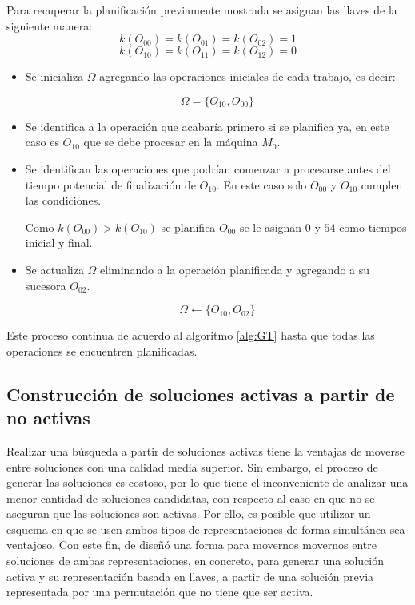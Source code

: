 Para recuperar la planificación previamente mostrada se asignan las llaves de la siguiente manera: \[k(O_{00})=k(O_{01})=k(O_{02})=1\]  \[k(O_{10})=k(O_{11})=k(O_{12})=0\]
\begin{itemize}
    \item Se inicializa $\Omega$ agregando las operaciones iniciales de cada trabajo, es decir:

\[\Omega = \{O_{10},O_{00}\}\]

     \item Se identifica a la operación que acabaría primero si se planifica ya, en este caso es $O_{10}$ que se debe procesar en la máquina $M_0$. 

     \item Se identifican las operaciones que podrían comenzar a procesarse antes del tiempo potencial de finalización de $O_{10}$. 
		 En este caso solo $O_{00}$ y  $O_{10}$ cumplen las condiciones.

Como $k(O_{00})>k(O_{10})$ se planifica $O_{00}$ se le asignan $0$ y $54$ como tiempos inicial y final.

     \item Se actualiza $\Omega$ eliminando a la operación planificada y agregando a su sucesora $O_{02}$.

\[\Omega\leftarrow \{O_{10},O_{02}\}\]
\end{itemize}
Este proceso continua de acuerdo al algoritmo \ref{alg:GT} hasta que todas las operaciones se encuentren planificadas.

\subsection{Construcción de soluciones activas a partir de no activas}

Realizar una búsqueda a partir de soluciones activas tiene la ventajas de moverse entre soluciones con una calidad media
superior.
%
Sin embargo, el proceso de generar las soluciones es costoso, por lo que tiene el inconveniente de analizar una menor
cantidad de soluciones candidatas, con respecto al caso en que no se aseguran que las soluciones son activas.
%
Por ello, es posible que utilizar un esquema en que se usen ambos tipos de representaciones de forma simultánea sea
ventajoso.
%
Con este fin, de diseñó una forma para movernos movernos entre soluciones de ambas representaciones, en concreto, para
generar una solución activa y su representación basada en llaves, a partir de una solución previa representada por una permutación que no tiene que ser activa. 

